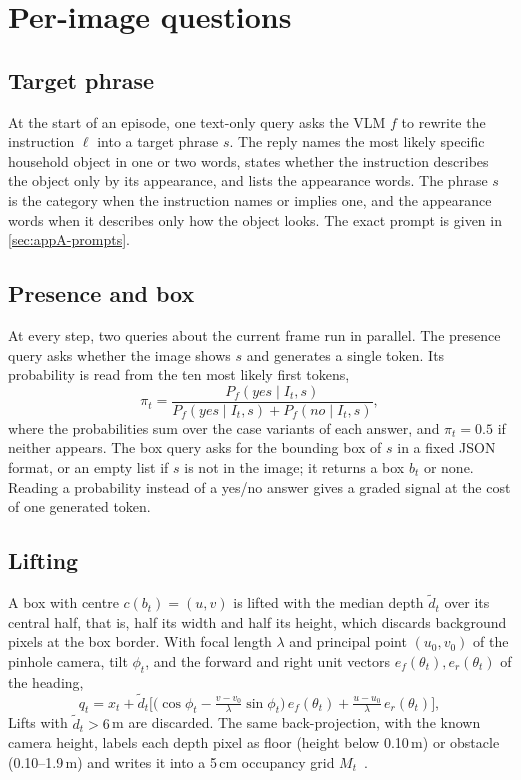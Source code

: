 \section{Per-image questions}
\label{sec:method-questions}
\subsection{Target phrase}
At the start of an episode, one text-only query asks the VLM $f$ to rewrite the instruction $\ell$ into a target
phrase $s$. The reply names the most likely specific household object in one or two words, states whether the
instruction describes the object only by its appearance, and lists the appearance words. The phrase $s$ is the
category when the instruction names or implies one, and the appearance words when it describes only how the object
looks. The exact prompt is given in \cref{sec:appA-prompts}.

\subsection{Presence and box}
At every step, two queries about the current frame run in parallel. The presence query asks whether the image shows
$s$ and generates a single token. Its probability is read from the ten most likely first tokens,
\begin{equation}
\pi_t=\frac{P_f(\textit{yes}\mid I_t,s)}{P_f(\textit{yes}\mid I_t,s)+P_f(\textit{no}\mid I_t,s)},
\label{eq:presence}
\end{equation}
where the probabilities sum over the case variants of each answer, and $\pi_t=0.5$ if neither appears. The box query
asks for the bounding box of $s$ in a fixed JSON format, or an empty list if $s$ is not in the image; it returns a box
$b_t$ or none. Reading a probability instead of a yes/no answer gives a graded signal at the cost of one generated
token.

\subsection{Lifting}
\label{sec:method-lift}
A box with centre $c(b_t)=(u,v)$ is lifted with the median depth $\tilde d_t$ over its central half, that is, half
its width and half its height, which discards background pixels at the box border. With focal length $\lambda$ and
principal point $(u_0,v_0)$ of the pinhole camera, tilt $\phi_t$, and the forward and right unit vectors
$e_f(\theta_t),e_r(\theta_t)$ of the heading,
\begin{equation}
q_t=x_t+\tilde d_t\Big[\big(\cos\phi_t-\tfrac{v-v_0}{\lambda}\sin\phi_t\big)\,e_f(\theta_t)
+\tfrac{u-u_0}{\lambda}\,e_r(\theta_t)\Big],
\label{eq:lift}
\end{equation}
Lifts with $\tilde d_t>6$\,m are discarded. The same
back-projection, with the known camera height, labels each depth pixel as floor (height below 0.10\,m) or obstacle
(0.10--1.9\,m) and writes it into a 5\,cm occupancy grid $M_t$~\cite{elfes1989occupancy}.

